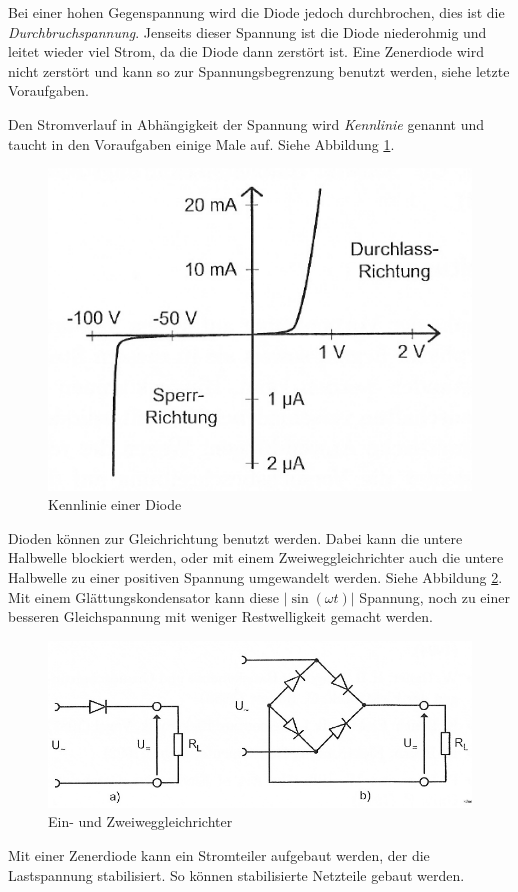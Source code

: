 Bei einer hohen Gegenspannung wird die Diode jedoch durchbrochen, dies ist die
\emph{Durchbruchspannung}. Jenseits dieser Spannung ist die Diode niederohmig
und leitet wieder viel Strom, da die Diode dann zerstört ist. Eine Zenerdiode
wird nicht zerstört und kann so zur Spannungsbegrenzung benutzt werden, siehe
letzte Voraufgaben.

Den Stromverlauf in Abhängigkeit der Spannung wird \emph{Kennlinie} genannt und
taucht in den Voraufgaben einige Male auf. Siehe Abbildung \ref{fig:2.2}.

\begin{figure}[h]
	\centering
	\caption{%
		Kennlinie einer Diode \cite[Abbildung~2.2]{physik313-Anleitung}
	}
	\label{fig:2.2}
	\includegraphics[width=.45\linewidth]{Bilder_aus_Anleitung/2-2.png}
\end{figure}

Dioden können zur Gleichrichtung benutzt werden. Dabei kann die untere
Halbwelle blockiert werden, oder mit einem Zweiweggleichrichter auch die untere
Halbwelle zu einer positiven Spannung umgewandelt werden. Siehe Abbildung
\ref{fig:2.4}. Mit einem Glättungskondensator kann diese $|\sin(\omega t)|$
Spannung, noch zu einer besseren Gleichspannung mit weniger Restwelligkeit
gemacht werden.

\begin{figure}[h]
	\centering
	\caption{%
		Ein- und Zweiweggleichrichter \cite[Abbildung~2.4]{physik313-Anleitung}
	}
	\label{fig:2.4}
	\includegraphics[width=.7\linewidth]{Bilder_aus_Anleitung/2-4.png}
\end{figure}

Mit einer Zenerdiode kann ein Stromteiler aufgebaut werden, der die
Lastspannung stabilisiert. So können stabilisierte Netzteile gebaut werden.

